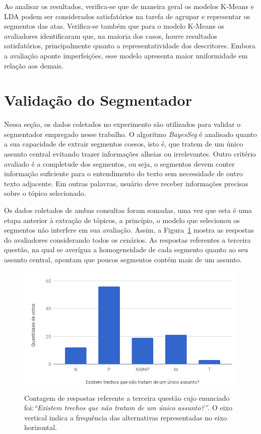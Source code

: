 Ao analisar os resultados, verifica-se que de maneira geral os modelos K-Means e LDA podem ser considerados satisfatórios na tarefa de agrupar e representar os segmentos das atas.
Verifica-se também que para o modelo K-Means os avaliadores identificaram que, na maioria dos casos, houve resultados satisfatórios, principalmente quanto a representatividade dos descritores. Embora a avaliação aponte imperfeições, esse modelo apresenta maior uniformidade em relação aos demais.

\section{Validação do Segmentador}

Nessa seção, os dados coletados no experimento são utilizados para validar o segmentador empregado nesse trabalho. O algoritmo \textit{BayesSeg} é analisado quanto a sua capacidade de extrair segmentos coesos, isto é, que tratem de um único assunto central evitando trazer informações alheias ou irrelevantes. Outro critério avaliado é a completude dos segmentos, ou seja, o segmentos devem conter informação suficiente para o entendimento do texto sem necessidade de outro texto adjacente. Em outras palavras, usuário deve receber informações precisas sobre o tópico selecionado.

Os dados coletados de ambas consultas foram somadas, uma vez que esta é uma etapa anterior à extração de tópicos, a princípio, o modelo que selecionou os segmentos não interfere em sua avaliação. Assim, a Figura~\ref{fig:Q3} mostra as respostas do avaliadores considerando todos os cenários. As respostas referentes a terceira questão, na qual se averígua a homogeneidade de cada segmento quanto ao seu assunto central, apontam que poucos segmentos contém mais de um assunto.

\begin{figure}[!h] \centering     %

		\includegraphics[width=.48\textwidth]{conteudo/capitulos/figs/figuras-experimento/Q3-Seg.png}
	\caption{Contagem de respostas referente a terceira questão cujo enunciado foi:\textit{``Existem trechos que não tratam de um único assunto?''}. O eixo vertical indica a frequência das alternativas representadas no eixo horizontal. }
	\label{fig:Q3}
\end{figure}


